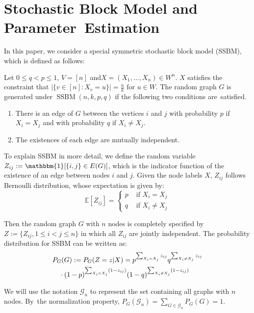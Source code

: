 \documentclass[entropy,article,accept,moreauthors,pdftex]{Definitions/mdpi}
\newcommand{\cG}{\mathcal{G}}
\newcommand{\1}{\mathbbm{1}}
\DeclareMathOperator{\SSBM}{SSBM}
\begin{document}
\section{Stochastic Block Model and Parameter~Estimation}\label{sec:psbm}
In this paper, we consider a special symmetric stochastic block model (SSBM), which is defined as follows:
	\begin{Definition} \label{def:SSBM}
	Let $0\leq q<p\leq 1$, $V=[n]$ and\linebreak $X=(X_1,\dots,X_n)\in W^n$. $X$ satisfies the constraint that $|\{v \in [n] : X_v = u\}| = \frac{n}{k}$ for $u\in W$.
	The random graph $G$ is generated under $\SSBM(n,k,p,q)$ if the following two conditions are~satisfied.
	\begin{enumerate}
	\item There is an edge of $G$ between the vertices $i$ and $j$ with probability $p$ if $X_i=X_j$ and with probability $q$ if $X_i \neq X_j$.
	\item The existences of each edge are mutually independent.
	\end{enumerate}
\end{Definition}
To explain SSBM in more detail,
we define the random variable $Z_{ij}:=\mathbbm{1}[\{i,j\} \in E(G)]$, which is the indicator function of the existence of an edge between nodes $i$ and $j$.
Given the node labels $X$, $Z_{ij}$ follows Bernoulli distribution, whose expectation is given by:
\begin{equation}
\mathbb{E}[Z_{ij}] =
\begin{cases}
p & \textrm{ if } X_i = X_j \\ 
q & \textrm{ if }  X_i \neq X_j
\end{cases}
\end{equation}

Then the random graph $G$ with $n$ nodes
is completely specified by\linebreak $Z:=\{Z_{ij}, 1\leq i<j\leq n\}$ in which all $Z_{ij}$ are jointly independent.
The probability distribution for SSBM can be written as:
\begin{align}
&P_G(G):=P_G(Z = z| X) = p^{\sum_{X_i = X_j} z_{ij}}q^{\sum_{X_i \neq X_j} z_{ij}} \notag \\
&\quad \cdot (1-p)^{\sum_{X_i = X_j} (1-z_{ij})}(1-q)^{\sum_{X_i \neq X_j} (1-z_{ij})} \label{eq:GmL}
\end{align}

We will use the notation $\cG_n$ to represent the set containing all graphs with $n$ nodes. By~the normalization property,
$P_G(\cG_n) = \sum_{G\in \cG_n}P_G(G)=1$.
\end{document}
